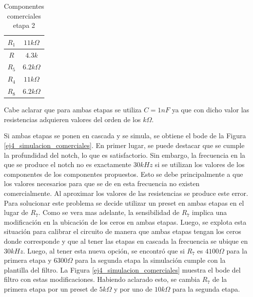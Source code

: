 \begin{table}[h!]
    \centering
    \begin{tabular}{|c|c|}
    \hline
    $R_1$ & $11k\Omega$ \\ \hline
    $R$   & $4.3k$   \\ \hline
    $R_5$ & $6.2k \Omega$  \\ \hline
    $R_4$ & $11k \Omega$ \\ \hline
    $R_8$ & $6.2k \Omega$ \\ \hline
    \end{tabular}
    \caption{Componentes comerciales etapa 2}
    \label{tab:ej4_e2_componentes}
    \end{table}

Cabe aclarar que para ambas etapas se utiliza $C = 1nF$ ya que con dicho valor las resistencias adquieren valores del orden de los $k\Omega$. 

Si ambas etapas se ponen en cascada y se simula, se obtiene el bode de la Figura \ref{ej4_simulacion_comerciales}. En primer lugar, se puede destacar que se cumple la profundidad del notch, lo que es satisfactorio. Sin embargo, la frecuencia en la que se produce el notch no es exactamente $30kHz$ si se utilizan los valores de los componentes de los componentes propuestos. Esto se debe principalmente a que los valores necesarios para que se de en esta frecuencia no existen comercialmente. Al aproximar los valores de las resistencias se produce este error. Para solucionar este problema se decide utilizar un preset en ambas etapas en el lugar de $R_7$. Como se vera mas adelante, la sensibilidad de $R_7$ implica una modificación en la ubicación de los ceros en ambas etapas. Luego, se explota esta situación para calibrar el circuito de manera que ambas etapas tengan los ceros donde corresponde y que al tener las etapas en cascada la frecuencia se ubique en $30kHz$. Luego, al tener esta nueva opción, se encontró que si $R_7$ es $4100 \Omega$ para la primera etapa y $6300 \Omega$ para la segunda etapa la simulación cumple con la plantilla del filtro. La Figura \ref{ej4_simulacion_comerciales} muestra el bode del filtro con estas modificaciones. Habiendo aclarado esto, se cambia $R_7$ de la primera etapa por un preset de $5k \Omega$ y por uno de $10k \Omega$ para la segunda etapa. 

